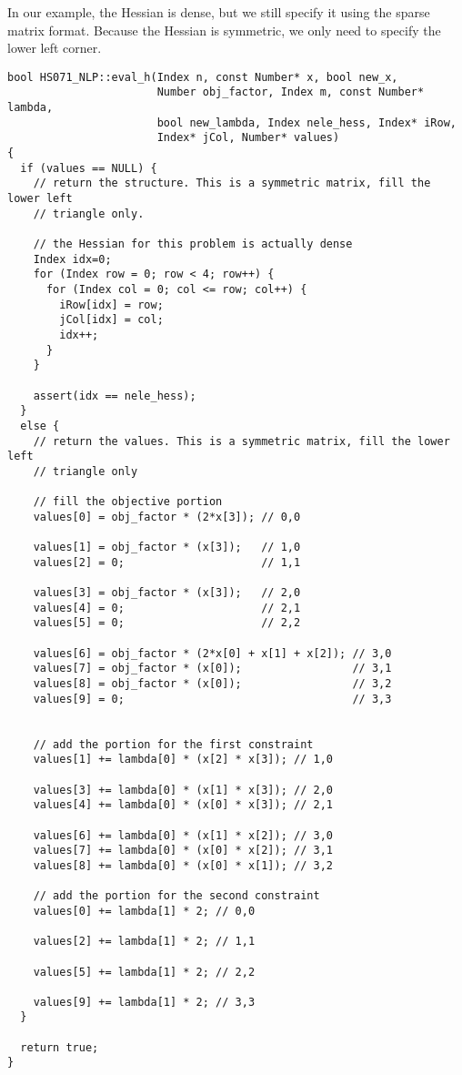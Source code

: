 \documentclass[letter,10pt]{article}
\begin{document}
In our example, the Hessian is dense, but we still specify it using the
sparse matrix format. Because the Hessian is symmetric, we only need to 
specify the lower left corner.
\begin{footnotesize}
\begin{verbatim}
bool HS071_NLP::eval_h(Index n, const Number* x, bool new_x,
                       Number obj_factor, Index m, const Number* lambda,
                       bool new_lambda, Index nele_hess, Index* iRow,
                       Index* jCol, Number* values)
{
  if (values == NULL) {
    // return the structure. This is a symmetric matrix, fill the lower left
    // triangle only.

    // the Hessian for this problem is actually dense
    Index idx=0;
    for (Index row = 0; row < 4; row++) {
      for (Index col = 0; col <= row; col++) {
        iRow[idx] = row; 
        jCol[idx] = col;
        idx++;
      }
    }
    
    assert(idx == nele_hess);
  }
  else {
    // return the values. This is a symmetric matrix, fill the lower left
    // triangle only

    // fill the objective portion
    values[0] = obj_factor * (2*x[3]); // 0,0

    values[1] = obj_factor * (x[3]);   // 1,0
    values[2] = 0;                     // 1,1

    values[3] = obj_factor * (x[3]);   // 2,0
    values[4] = 0;                     // 2,1
    values[5] = 0;                     // 2,2

    values[6] = obj_factor * (2*x[0] + x[1] + x[2]); // 3,0
    values[7] = obj_factor * (x[0]);                 // 3,1
    values[8] = obj_factor * (x[0]);                 // 3,2
    values[9] = 0;                                   // 3,3


    // add the portion for the first constraint
    values[1] += lambda[0] * (x[2] * x[3]); // 1,0
    
    values[3] += lambda[0] * (x[1] * x[3]); // 2,0
    values[4] += lambda[0] * (x[0] * x[3]); // 2,1

    values[6] += lambda[0] * (x[1] * x[2]); // 3,0
    values[7] += lambda[0] * (x[0] * x[2]); // 3,1
    values[8] += lambda[0] * (x[0] * x[1]); // 3,2

    // add the portion for the second constraint
    values[0] += lambda[1] * 2; // 0,0

    values[2] += lambda[1] * 2; // 1,1

    values[5] += lambda[1] * 2; // 2,2

    values[9] += lambda[1] * 2; // 3,3
  }

  return true;
}
\end{verbatim}
\end{footnotesize}
\end{document}
